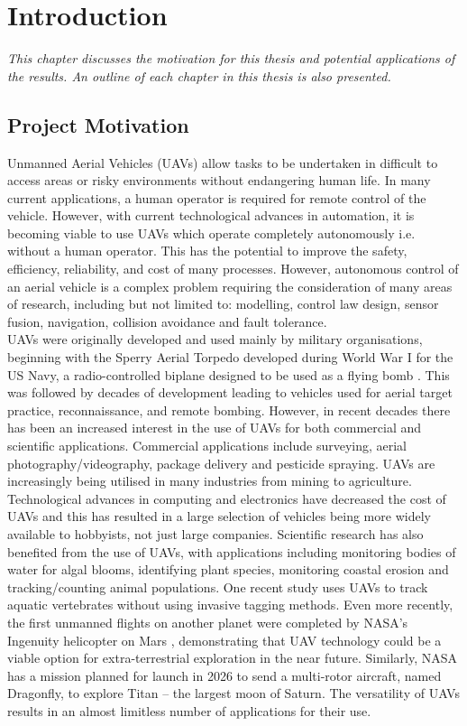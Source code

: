 
\chapter{Introduction}
\textit{This chapter discusses the motivation for this thesis and potential applications of the results. An outline of each chapter in this thesis is also presented.}\\

\section{Project Motivation}
Unmanned Aerial Vehicles (UAVs) allow tasks to be undertaken in difficult to access areas or risky environments without endangering human life. In many current applications, a human operator is required for remote control of the vehicle. However, with current technological advances in automation, it is becoming viable to use UAVs which operate completely autonomously i.e. without a human operator. This has the potential to improve the safety, efficiency, reliability, and cost of many processes. However, autonomous control of an aerial vehicle is a complex problem requiring the consideration of many areas of research, including but not limited to: modelling, control law design, sensor fusion, navigation, collision avoidance and fault tolerance.\\

UAVs were originally developed and used mainly by military organisations, beginning with the Sperry Aerial Torpedo developed during World War I for the US Navy, a radio-controlled biplane designed to be used as a flying bomb \cite{Stoff2001}. This was followed by decades of development leading to vehicles used for aerial target practice, reconnaissance, and remote bombing. However, in recent decades there has been an increased interest in the use of UAVs for both commercial and scientific applications. Commercial applications include surveying, aerial photography/videography, package delivery and pesticide spraying. UAVs are increasingly being utilised in many industries from mining to agriculture. Technological advances in computing and electronics have decreased the cost of UAVs and this has resulted in a large selection of vehicles being more widely available to hobbyists, not just large companies. Scientific research has also benefited from the use of UAVs, with applications including monitoring bodies of water for algal blooms, identifying plant species, monitoring coastal erosion and tracking/counting animal populations. One recent study \cite{Raoult2018} uses UAVs to track aquatic vertebrates without using invasive tagging methods. Even more recently, the first unmanned flights on another planet were completed by NASA’s Ingenuity helicopter on Mars \cite{Johnson2021}, demonstrating that UAV technology could be a viable option for extra-terrestrial exploration in the near future. Similarly, NASA has a mission planned for launch in 2026 to send a multi-rotor aircraft, named Dragonfly, to explore Titan – the largest moon of Saturn\cite{Hautaluoma2019}.  The versatility of UAVs results in an almost limitless number of applications for their use.\\

